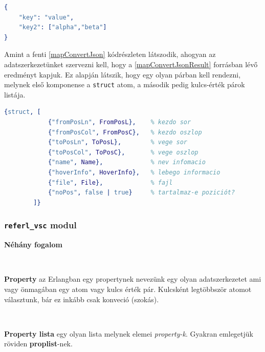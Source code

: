 \lstset{caption=Átalakított példa szótár, label=src:erlang} \label{mapConvertJsonResult}
\begin{lstlisting}[language={erlang}] 
{
    "key": "value",
    "key2": ["alpha","beta"]
}
\end{lstlisting}

Amint a fenti \ref{mapConvertJson} kódrészleten látszodik, ahogyan az adatszerkezetünket szervezni kell, hogy a \ref{mapConvertJsonResult} forrásban lévő eredményt kapjuk. Ez alapján látszik, hogy egy olyan párban kell rendezni, melynek első komponense a \lstinline{struct} atom, a második pedig kulcs-érték párok listája.


\lstset{caption=Egy lekérdezés egyetlen elemének reprezentációja, label=src:erlang} \label{structQueryRes}
\begin{lstlisting}[language={erlang}]
{struct, [
            {"fromPosLn", FromPosL},    % kezdo sor
            {"fromPosCol", FromPosC},   % kezdo oszlop
            {"toPosLn", ToPosL},        % vege sor
            {"toPosCol", ToPosC},       % vege oszlop
            {"name", Name},             % nev infomacio
            {"hoverInfo", HoverInfo},   % lebego informacio
            {"file", File},             % fajl
            {"noPos", false | true}     % tartalmaz-e poziciót?
        ]}
\end{lstlisting}



\subsubsection{\lstinline{referl_vsc} modul}

\noindent \textbf{Néhány fogalom}

\\
\vspace{14pt}

\noindent \textbf{Property} az Erlangban egy propertynek nevezünk egy olyan adatszerkezetet  ami vagy önmagában egy atom vagy kulcs érték pár. Kulcsként legtöbbször atomot választunk, bár ez inkább csak konveció (szokás).

\\
\vspace{14pt}


\noindent \textbf{Property lista} egy olyan lista melynek elemei \textit{property-k}. Gyakran emlegetjük röviden \textbf{proplist}-nek.

\\
\vspace{14pt}

